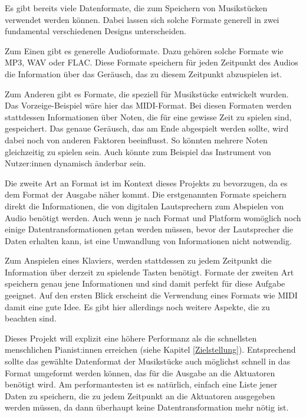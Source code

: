Es gibt bereits viele Datenformate, die zum Speichern von Musikstücken verwendet werden können. Dabei lassen sich solche Formate generell in zwei fundamental verschiedenen Designs unterscheiden.

Zum Einen gibt es generelle Audioformate. Dazu gehören solche Formate wie MP3, WAV oder FLAC.
Diese Formate speichern für jeden Zeitpunkt des Audios die Information über das Geräusch, das zu diesem Zeitpunkt abzuspielen ist.

Zum Anderen gibt es Formate, die speziell für Musikstücke entwickelt wurden.
Das Vorzeige-Beispiel wäre hier das MIDI-Format.
Bei diesen Formaten werden stattdessen Informationen über Noten, die für eine gewisse Zeit zu spielen sind, gespeichert.
Das genaue Geräusch, das am Ende abgespielt werden sollte, wird dabei noch von anderen Faktoren beeinflusst.
So könnten mehrere Noten gleichzeitig zu spielen sein.
Auch könnte zum Beispiel das Instrument von Nutzer:innen dynamisch änderbar sein.

Die zweite Art an Format ist im Kontext dieses Projekts zu bevorzugen, da es dem Format der Ausgabe näher kommt.
Die erstgenannten Formate speichern direkt die Informationen, die von digitalen Lautsprechern zum Abspielen von Audio benötigt werden.
Auch wenn je nach Format und Platform womöglich noch einige Datentransformationen getan werden müssen, bevor der Lautsprecher die Daten erhalten kann, ist eine Umwandlung von Informationen nicht notwendig.

Zum Anspielen eines Klaviers, werden stattdessen zu jedem Zeitpunkt die Information über derzeit zu spielende Tasten benötigt.
Formate der zweiten Art speichern genau jene Informationen und sind damit perfekt für diese Aufgabe geeignet.
Auf den ersten Blick erscheint die Verwendung eines Formats wie MIDI damit eine gute Idee.
Es gibt hier allerdings noch weitere Aspekte, die zu beachten sind.

Dieses Projekt will explizit eine höhere Performanz als die schnellsten menschlichen Pianist:innen erreichen (siehe Kapitel \ref*{Zielstellung}).
Entsprechend sollte das gewählte Datenformat der Musikstücke auch möglichst schnell in das Format umgeformt werden können, das für die Ausgabe an die Aktuatoren benötigt wird.
Am performantesten ist es natürlich, einfach eine Liste jener Daten zu speichern, die zu jedem Zeitpunkt an die Aktuatoren ausgegeben werden müssen, da dann überhaupt keine Datentransformation mehr nötig ist.

